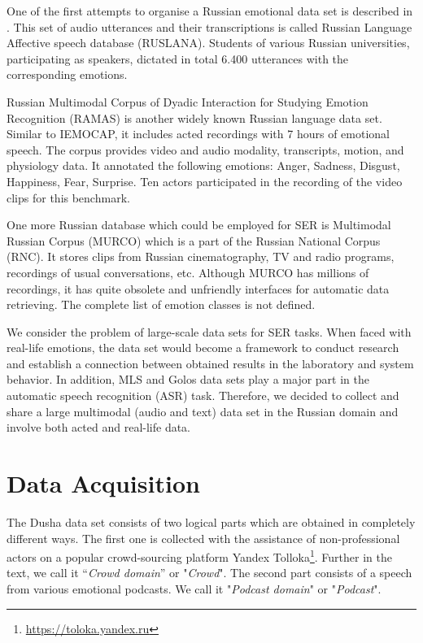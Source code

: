 \documentclass{article}
\begin{document}
One of the first attempts to organise a Russian emotional data set is described in \cite{ruslana}. This set of audio utterances and their transcriptions is called Russian Language Affective speech database (RUSLANA). Students of various Russian universities, participating as speakers, dictated in total 6.400 utterances with the corresponding emotions.

Russian Multimodal Corpus of Dyadic Interaction for Studying Emotion Recognition (RAMAS) \cite{ramas} is another widely known Russian language data set. Similar to IEMOCAP, it includes acted recordings with 7 hours of emotional speech. The corpus provides video and audio modality, transcripts, motion, and physiology data. It annotated the following emotions: Anger, Sadness, Disgust, Happiness, Fear, Surprise. Ten actors participated in the recording of the video clips for this benchmark.

One more Russian database which could be employed for SER is Multimodal Russian Corpus (MURCO) \cite{murco} which is a part of the Russian National Corpus (RNC). It stores clips from Russian cinematography, TV and radio programs, recordings of usual conversations, etc. Although MURCO has millions of recordings, it has quite obsolete and unfriendly interfaces for automatic data retrieving. The complete list of emotion classes is not defined. 

We consider the problem of large-scale data sets for SER tasks.
When faced with real-life emotions, the data set would become a framework to conduct research and establish a connection between obtained results in the laboratory and system behavior.
In addition, MLS \cite{pratap2020mls} and Golos \cite{karpov2021golos} data sets play a major part in the automatic speech recognition (ASR) task.
Therefore, we decided to collect and share a large multimodal (audio and text) data set in the Russian domain and involve both acted and real-life data.

\section{Data Acquisition}

The Dusha data set consists of two logical parts which are obtained in completely different ways. The first one is collected with the assistance of non-professional actors on a popular crowd-sourcing platform Yandex Tolloka\footnote{\url{https://toloka.yandex.ru}}. 
Further in the text, we call it “\textit{Crowd domain}” or "\textit{Crowd}". 
The second part consists of a speech from various emotional podcasts. We call it "\textit{Podcast domain}" or "\textit{Podcast}". 
\end{document}
